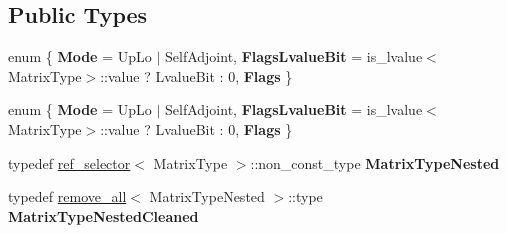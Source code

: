 \subsection*{Public Types}
\begin{DoxyCompactItemize}
\item 
\mbox{\label{struct_eigen_1_1internal_1_1traits_3_01_self_adjoint_view_3_01_matrix_type_00_01_up_lo_01_4_01_4_abd3c9f44fa75d602f69fa006593c8bb1}} 
enum \{ {\bfseries Mode} = Up\+Lo $\vert$ Self\+Adjoint, 
{\bfseries Flags\+Lvalue\+Bit} = is\+\_\+lvalue$<$Matrix\+Type$>$\+:\+:value ? Lvalue\+Bit \+: 0, 
{\bfseries Flags}
 \}
\item 
\mbox{\label{struct_eigen_1_1internal_1_1traits_3_01_self_adjoint_view_3_01_matrix_type_00_01_up_lo_01_4_01_4_a747a12fb1829464d43ca6ae59de43ff6}} 
enum \{ {\bfseries Mode} = Up\+Lo $\vert$ Self\+Adjoint, 
{\bfseries Flags\+Lvalue\+Bit} = is\+\_\+lvalue$<$Matrix\+Type$>$\+:\+:value ? Lvalue\+Bit \+: 0, 
{\bfseries Flags}
 \}
\item 
\mbox{\label{struct_eigen_1_1internal_1_1traits_3_01_self_adjoint_view_3_01_matrix_type_00_01_up_lo_01_4_01_4_a78fbe1472ee4d87826b253c2b194062b}} 
typedef \hyperlink{struct_eigen_1_1internal_1_1ref__selector}{ref\+\_\+selector}$<$ Matrix\+Type $>$\+::non\+\_\+const\+\_\+type {\bfseries Matrix\+Type\+Nested}
\item 
\mbox{\label{struct_eigen_1_1internal_1_1traits_3_01_self_adjoint_view_3_01_matrix_type_00_01_up_lo_01_4_01_4_a9a5dcf20cb07f9a3fb8f7ec32f8eaaad}} 
typedef \hyperlink{struct_eigen_1_1internal_1_1remove__all}{remove\+\_\+all}$<$ Matrix\+Type\+Nested $>$\+::type {\bfseries Matrix\+Type\+Nested\+Cleaned}
\item 
\mbox{\label{struct_eigen_1_1internal_1_1traits_3_01_self_adjoint_view_3_01_matrix_type_00_01_up_lo_01_4_01_4_aeaf9375b523c8415dddb7e48b60a3347}} 

\end{DoxyCompactItemize}
